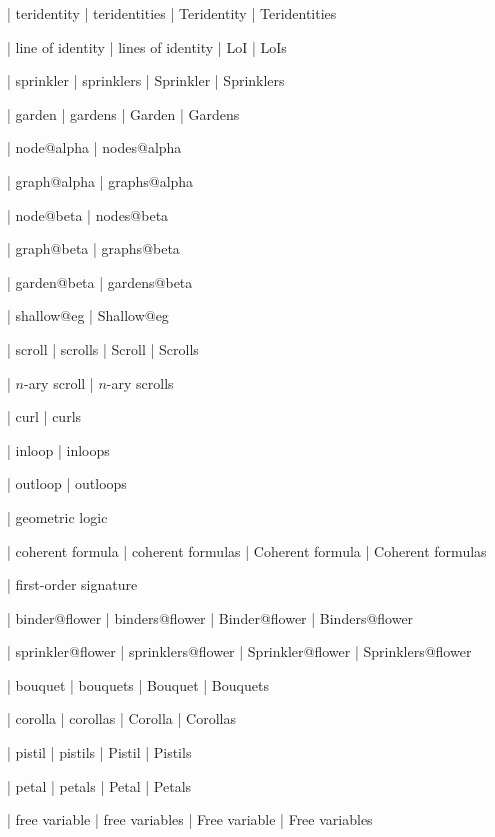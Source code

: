  | teridentity
 | teridentities
 | Teridentity
 | Teridentities

 | line of identity
 | lines of identity
 | LoI
 | LoIs

 | sprinkler
 | sprinklers
 | Sprinkler
 | Sprinklers

 | garden
 | gardens
 | Garden
 | Gardens

 | node@alpha
 | nodes@alpha

 | graph@alpha
 | graphs@alpha

 | node@beta
 | nodes@beta

 | graph@beta
 | graphs@beta

 | garden@beta
 | gardens@beta

 | shallow@eg
 | Shallow@eg


 | scroll
 | scrolls
 | Scroll
 | Scrolls

 | $n$-ary scroll
 | $n$-ary scrolls

 | curl
 | curls

 | inloop
 | inloops

 | outloop
 | outloops

 | geometric logic

 | coherent formula
 | coherent formulas
 | Coherent formula
 | Coherent formulas

 | first-order signature

 | binder@flower
 | binders@flower
 | Binder@flower
 | Binders@flower

 | sprinkler@flower
 | sprinklers@flower
 | Sprinkler@flower
 | Sprinklers@flower

 | bouquet
 | bouquets
 | Bouquet
 | Bouquets

 | corolla
 | corollas
 | Corolla
 | Corollas

 | pistil
 | pistils
 | Pistil
 | Pistils

 | petal
 | petals
 | Petal
 | Petals

 | free variable
 | free variables
 | Free variable
 | Free variables

